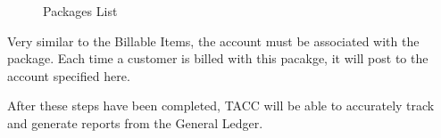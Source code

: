 \begin{enumerate}
\begin{figure}[hbtp]
\caption{ \label{fig:PackagesList} Packages List}
\end{figure}
Very similar to the Billable Items, the account must be associated with
the package.  Each time a customer is billed with this pacakge, it will
post to the account specified here.
\end{enumerate}
After these steps have been completed, TACC will be able to accurately
track and generate reports from the General Ledger.

